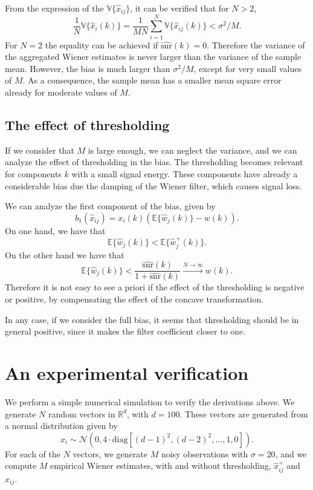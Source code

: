 \documentclass[a4paper,10pt]{article}
\begin{document}
From the expression of the $\mathbb V\{\hat x_{ij}\}$, it can be verified that for $N > 2$, 
\[\frac1N\mathbb V\{\hat x_i(k)\} = \frac1{MN}\sum_{i = 1}^N\mathbb V\{\hat
x_{ij}(k)\} < \sigma^2/M.\]
For $N = 2$ the equality can be achieved if
$\hat{\text{snr}}(k) = 0$. Therefore the variance of the aggregated Wiener estimates
is never larger than the variance of the sample mean. However, the bias is much
larger than $\sigma^2/M$, except for very small values of $M$.
As a consequence, the sample mean has a smaller mean square error already for
moderate values of $M$.


\subsection{The effect of thresholding}

If we consider that $M$ is large enough, we can neglect the variance,
and we can analyze the effect of thresholding in the bias.
The thresholding becomes relevant for components $k$ with a small 
signal energy. These components have already a considerable bias
due the damping of the Wiener filter, which causes signal loss.

We can analyze the first component of the bias, given by
\[b_1(\hat x_{ij}) = x_i(k)(\mathbb E\{\hat w_j(k)\} - w(k)).\]
On one hand, we have that
\[\mathbb E\{\hat w_j(k)\} < \mathbb E\{\hat w^+_j(k)\}.\]
On the other hand we have that
\[\mathbb E\{\hat w_j(k)\} < \frac{\hat{\text{snr}}(k)}{1 + \hat{\text{snr}}(k)} \xrightarrow{N\to\infty} w(k).\]
Therefore it is not easy to see a priori if the effect of the thresholding is 
negative or positive, by compensating the effect of the concave transformation.

In any case, if we consider the full bias, it seems that thresholding should be
in general positive, since it makes the filter coefficient closer to one.






\section{An experimental verification}

We perform a simple numerical simulation to verify the derivations above.
We generate $N$ random vectors in $\mathbb R^d$, with $d = 100$. These 
vectors are generated from a normal distribution given by
\[x_i\sim \mathcal N(0, 4\cdot\text{diag}[(d-1)^2,(d-2)^2,\dots,1,0]).\]
For each of the $N$ vectors, we generate $M$ noisy observations with $\sigma =
20$, and we compute $M$ empirical Wiener estimates, with and without thresholding, $\hat
x^+_{ij}$ and $\hat x_{ij}$.
\end{document}
